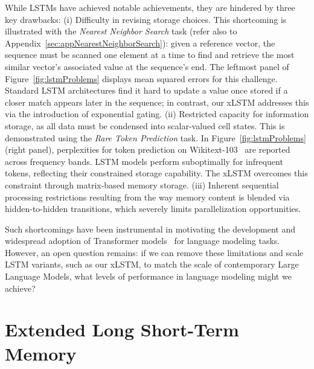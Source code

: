 While LSTMs have achieved notable achievements, they are hindered by three key drawbacks: (i) Difficulty in revising storage choices. This shortcoming is illustrated with the {\it Nearest Neighbor Search} task (refer also to Appendix~\ref{sec:appNearestNeighborSearch}): given a reference vector, the sequence must be scanned one element at a time to find and retrieve the most similar vector's associated value at the sequence's end. The leftmost panel of Figure~\ref{fig:lstmProblems} displays mean squared errors for this challenge. Standard LSTM architectures find it hard to update a value once stored if a closer match appears later in the sequence; in contrast, our xLSTM addresses this via the introduction of exponential gating. (ii) Restricted capacity for information storage, as all data must be condensed into scalar-valued cell states. This is demonstrated using the {\it Rare Token Prediction} task. In Figure~\ref{fig:lstmProblems} (right panel), perplexities for token prediction on Wikitext-103~\citep{Merity:17} are reported across frequency bands. LSTM models perform suboptimally for infrequent tokens, reflecting their constrained storage capability. The xLSTM overcomes this constraint through matrix-based memory storage. (iii) Inherent sequential processing restrictions resulting from the way memory content is blended via hidden-to-hidden transitions, which severely limits parallelization opportunities. 

Such shortcomings have been instrumental in motivating the development and widespread adoption of Transformer models~\citep{Vaswani:17} for language modeling tasks. However, an open question remains: if we can remove these limitations and scale LSTM variants, such as our xLSTM, to match the scale of contemporary Large Language Models, what levels of performance in language modeling might we achieve?

\section{Extended Long Short-Term Memory}
\label{sec:xLSTM}

